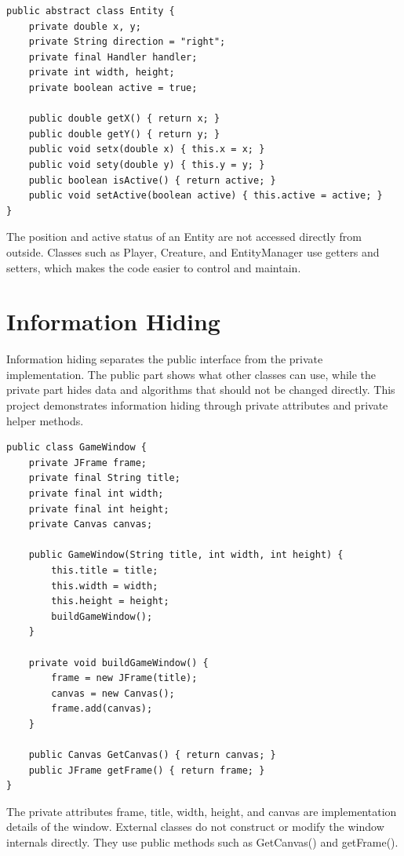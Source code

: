 \documentclass[12pt,a4paper]{article}
\begin{document}
\begin{lstlisting}
public abstract class Entity {
    private double x, y;
    private String direction = "right";
    private final Handler handler;
    private int width, height;
    private boolean active = true;

    public double getX() { return x; }
    public double getY() { return y; }
    public void setx(double x) { this.x = x; }
    public void sety(double y) { this.y = y; }
    public boolean isActive() { return active; }
    public void setActive(boolean active) { this.active = active; }
}
\end{lstlisting}

The position and active status of an Entity are not accessed directly from outside. Classes such as Player, Creature, and EntityManager use getters and setters, which makes the code easier to control and maintain.


\section*{Information Hiding}
Information hiding separates the public interface from the private implementation. The public part shows what other classes can use, while the private part hides data and algorithms that should not be changed directly. This project demonstrates information hiding through private attributes and private helper methods.

\begin{lstlisting}
public class GameWindow {
    private JFrame frame;
    private final String title;
    private final int width;
    private final int height;
    private Canvas canvas;

    public GameWindow(String title, int width, int height) {
        this.title = title;
        this.width = width;
        this.height = height;
        buildGameWindow();
    }

    private void buildGameWindow() {
        frame = new JFrame(title);
        canvas = new Canvas();
        frame.add(canvas);
    }

    public Canvas GetCanvas() { return canvas; }
    public JFrame getFrame() { return frame; }
}
\end{lstlisting}

The private attributes frame, title, width, height, and canvas are implementation details of the window. External classes do not construct or modify the window internals directly. They use public methods such as GetCanvas() and getFrame().
\end{document}

